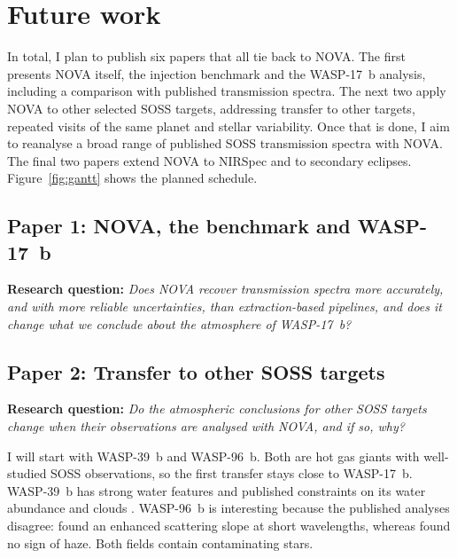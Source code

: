 \section{Future work}
\label{sec:future_work}
\label{sec:research-plan}


In total, I plan to publish six papers that all tie back to NOVA. The
first presents NOVA itself, the injection benchmark and the WASP-17~b
analysis, including a comparison with published transmission spectra. The
next two apply NOVA to other selected SOSS targets, addressing transfer to
other targets, repeated visits of the same planet and stellar variability.
Once that is done, I aim to reanalyse a broad range of published SOSS
transmission spectra with NOVA. The final two papers extend NOVA to
NIRSpec and to secondary eclipses. Figure~\ref{fig:gantt} shows the
planned schedule.

\subsection{Paper 1: NOVA, the benchmark and WASP-17~b}
\label{subsec:fw_benchmark}

\noindent\textbf{Research question:} \textit{Does NOVA recover
transmission spectra more accurately, and with more reliable
uncertainties, than extraction-based pipelines, and does it change what we
conclude about the atmosphere of WASP-17~b?}


\subsection{Paper 2: Transfer to other SOSS targets}
\label{subsec:fw_transfer}

\noindent\textbf{Research question:} \textit{Do the atmospheric
conclusions for other SOSS targets change when their observations are
analysed with NOVA, and if so, why?}

I will start with WASP-39~b and WASP-96~b. Both are hot gas giants with
well-studied SOSS observations, so the first transfer stays close to
WASP-17~b. WASP-39~b has strong water features and published constraints
on its water abundance and clouds \citep{FeinsteinEtAl2023,CarterEtAl2024}.
WASP-96~b is interesting because the published analyses disagree:
\citet{TaylorEtAl2023} found an enhanced scattering slope at short
wavelengths, whereas \citet{WangEtAl2026} found no sign of haze. Both
fields contain contaminating stars.

